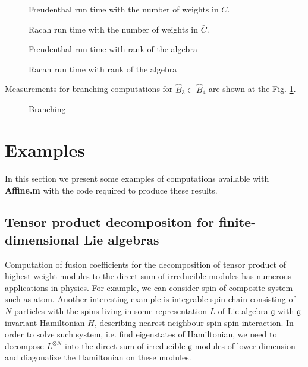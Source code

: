\documentclass[preprint,12pt]{elsarticle}
\newcommand{\gf}{\mathfrak{g}}
\begin{document}
\begin{figure}[h]
  \noindent\centering{
  }
  \caption{Freudenthal run time with the number of weights in $\bar C$.}

  \noindent\centering{
  }
  \caption{Racah run time with the number of weights in $\bar C$.}

  \noindent\centering{
  }
  \caption{Freudenthal run time with rank of the algebra}

  \noindent\centering{
  }
  \caption{Racah run time with rank of the algebra}
\end{figure}

Measurements for branching computations for $\hat B_{3}\subset \hat B_{4}$ are shown at the Fig. \ref{fig:branching}.
\begin{figure}[h]
  \label{fig:branching}
  \noindent\centering{
  }
  \caption{Branching}
\end{figure}

\section{Examples}
\label{sec:examples}
In this section we present some examples of computations available with {\bf Affine.m} with the code required to produce these results.

\subsection{Tensor product decompositon for finite-dimensional Lie algebras}
\label{sec:tens-prod-decomp}

Computation of fusion coefficients for the decomposition of tensor product of highest-weight modules to the direct sum of irreducible modules has numerous applications in physics. For example, we can consider spin of composite system such as atom. Another interesting example is integrable spin chain consisting of $N$ particles with the spins living in some representation $L$ of Lie algebra $\gf$ with $\gf$-invariant Hamiltonian $H$, describing nearest-neighbour spin-spin interaction. In order to solve such system, i.e. find eigenstates of Hamiltonian, we need to decompose $L^{\otimes N}$ into the direct sum of irreducible $\gf$-modules of lower dimension and diagonalize the Hamiltonian on these modules.
\end{document}
